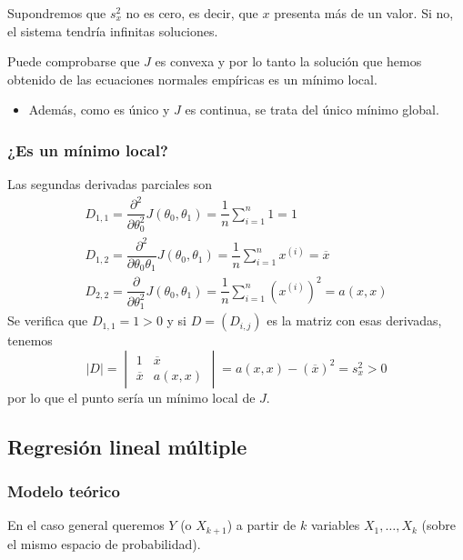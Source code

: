 Supondremos que $s_x^2$ no es cero, es decir, que $x$ presenta más de un valor. Si no, el sistema tendría infinitas soluciones.

Puede comprobarse que $J$ es convexa y por lo tanto la solución que hemos obtenido de las ecuaciones normales empíricas es un mínimo local.
\begin{itemize}[label=\color{lightblue}$\to$]
	\item Además, como es único y $J$ es continua, se trata del único mínimo global.
\end{itemize}

\subsubsection*{¿Es un mínimo local?}
Las segundas derivadas parciales son \[ \begin{array}{l}
	D_{1,1}=\dfrac{\partial^2}{\partial\theta_0^2}J(\theta_0,\theta_1)=\dfrac{1}{n}\sum_{i=1}^{n}1=1\\
	D_{1,2}=\dfrac{\partial^2}{\partial\theta_0\theta_1}J(\theta_0,\theta_1)=\dfrac{1}{n}\sum_{i=1}^{n}x^{(i)}=\overline{x}\\
	D_{2,2}=\dfrac{\partial}{\partial\theta_1^2}J(\theta_0,\theta_1)=\dfrac{1}{n}\sum_{i=1}^{n}\left(x^{(i)}\right)^2=a(x,x)
\end{array} \]
Se verifica que $D_{1,1}=1>0$ y si $D=(D_{i,j})$ es la matriz con esas derivadas, tenemos \[ |D|=\begin{vmatrix}
	1 & \overline{x}\\
	\overline{x} & a(x,x)
\end{vmatrix}=a(x,x)-(\overline{x})^2=s_x^2>0 \]por lo que el punto sería un mínimo local de $J$.

\subsection{Regresión lineal múltiple}
\subsubsection{Modelo teórico}
En el caso general queremos  $Y$ (o $X_{k+1}$) a partir de $k$ variables $X_1,\dots,X_k$ (sobre el mismo espacio de probabilidad).

